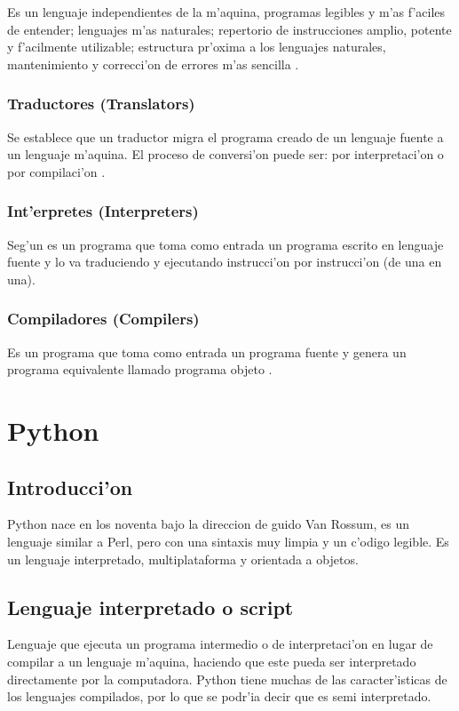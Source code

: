 Es un lenguaje independientes de la m'aquina, programas legibles y m'as f'aciles de entender; lenguajes m'as naturales; repertorio de instrucciones amplio, potente y f'acilmente utilizable;
 estructura pr'oxima a los lenguajes naturales, mantenimiento y correcci'on de errores m'as sencilla \citet{javier}.

\subsubsection{Traductores (Translators)}
Se establece que un traductor migra el programa creado de un lenguaje fuente a un lenguaje m'aquina. El proceso de conversi'on puede ser: por interpretaci'on o por compilaci'on \citep{javier}.
\subsubsection{Int'erpretes (Interpreters)}
Seg'un \citep{javier} es un programa que toma como entrada un programa escrito en lenguaje fuente y lo va
traduciendo y ejecutando instrucci'on por instrucci'on (de una en una).
\subsubsection{Compiladores (Compilers)}
Es un programa que toma como entrada un programa fuente y genera un programa
equivalente llamado programa objeto \citep{javier}.


\section{Python}
\subsection{Introducci'on}

Python nace en los noventa bajo la direccion de guido Van Rossum, es un lenguaje similar a Perl, pero con una sintaxis muy limpia y un c'odigo legible. Es un lenguaje interpretado, multiplataforma y orientada a objetos\citep{gonzales14}.

\subsection{Lenguaje interpretado o script}

Lenguaje que ejecuta un programa intermedio o de interpretaci'on en lugar de compilar a un lenguaje m'aquina, haciendo que este pueda ser interpretado directamente por la computadora. Python tiene muchas de las caracter'isticas de los lenguajes compilados, por lo que se podr'ia decir que es semi interpretado\citep{gonzales14}.



